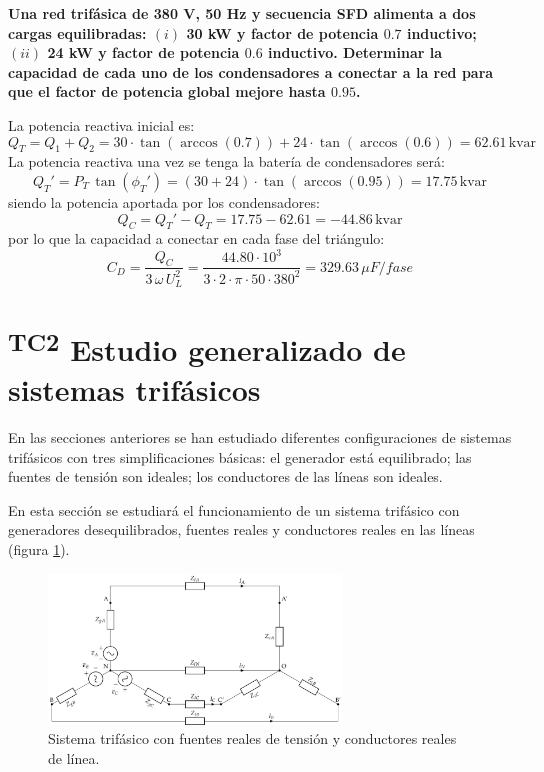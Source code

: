 \begin{example}\label{ex.compensacion_Q_trif}
  \textbf{Una red trifásica de 380 V, 50 Hz y secuencia SFD alimenta a
    dos cargas equilibradas: $(i)$ 30 kW y factor de potencia $0.7$
    inductivo; $(ii)$ 24 kW y factor de potencia $0.6$
    inductivo. Determinar la capacidad de cada uno de los
    condensadores a conectar a la red para que el factor de potencia
    global mejore hasta $0.95$.}
		    
  La potencia reactiva inicial es:
  \begin{equation*}
    Q_T=Q_1+Q_2=30\cdot \tan(\arccos(0.7))+24\cdot \tan(\arccos(0.6))=62.61\,\text{kvar}
  \end{equation*}
  La potencia reactiva una vez se tenga la batería de condensadores
  será:
  \begin{equation*}
    Q_T'=P_T\,\tan(\phi_T')=(30+24)\cdot \tan(\arccos(0.95))=17.75\,\text{kvar}
  \end{equation*}
  siendo la potencia aportada por los condensadores:
  \begin{equation*}
    Q_C=Q_T'-Q_T=17.75-62.61=-44.86\,\text{kvar}
  \end{equation*}
  por lo que la capacidad a conectar en cada fase del triángulo:
  \begin{equation*}
    C_D=\dfrac{Q_C}{3\,\omega\,U_L^2}=\dfrac{44.80\cdot 10^3}{3\cdot 2\cdot \pi\cdot 50\cdot 380^2}=329.63\,\mu F/fase
  \end{equation*}
\end{example}

		 


\section{\textsuperscript{TC2} Estudio generalizado de sistemas trifásicos}
\label{sec:estudio-generalizado-trifasica}


En las secciones anteriores se han estudiado diferentes configuraciones de sistemas trifásicos con tres simplificaciones básicas: el generador está equilibrado; las fuentes de tensión son ideales; los conductores de las líneas son ideales.

En esta sección se estudiará el funcionamiento de un sistema trifásico con generadores desequilibrados, fuentes reales y conductores reales en las líneas (figura \ref{fig:sistema-trifasico-general}).

\begin{figure}[H]
  \centering
  \includegraphics[height=4cm]{../figs/CircuitoTrifasicaGeneralizado.pdf}
  \caption{Sistema trifásico con fuentes reales de tensión y conductores reales de línea.}
  \label{fig:sistema-trifasico-general}
\end{figure}

